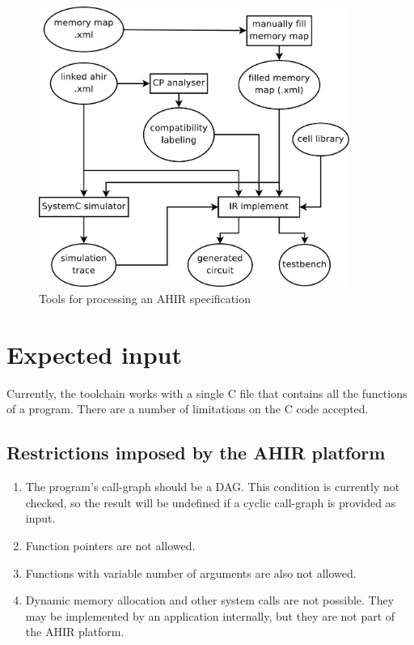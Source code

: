 \documentclass[12pt]{article}
\begin{document}
\begin{figure}[htb]
  \centering
  \includegraphics[keepaspectratio,width=4in]{images/simulation-and-synthesis.pdf}
  \caption{Tools for processing an AHIR specification}
  \label{figure:simulation-and-synthesis}
\end{figure}

\section{Expected input}

Currently, the toolchain works with a single C file that contains all
the functions of a program. There are a number of limitations on the C
code accepted.

\subsection{Restrictions imposed by the AHIR platform}

\begin{enumerate}
  \item The program's call-graph should be a DAG. This condition is
        currently not checked, so the result will be undefined if a
        cyclic call-graph is provided as input.
  \item Function pointers are not allowed.
  \item Functions with variable number of arguments are also not
        allowed.
  \item Dynamic memory allocation and other system calls are not
        possible. They may be implemented by an application
        internally, but they are not part of the AHIR platform.
\end{enumerate}
\end{document}
